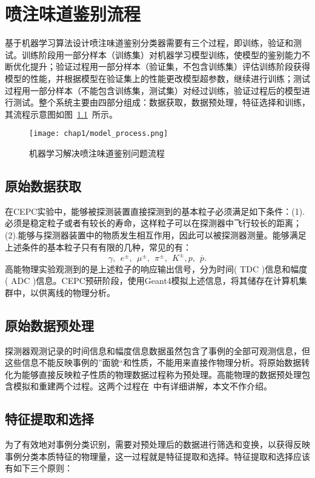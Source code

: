 \chapter{喷注味道鉴别流程}
基于机器学习算法设计喷注味道鉴别分类器需要有三个过程，即训练，验证和测试。训练阶段用一部分样本（训练集）对机器学习模型训练，使模型的鉴别能力不断优化提升；验证过程用一部分样本（验证集，不包含训练集）评估训练阶段获得模型的性能，并根据模型在验证集上的性能更改模型超参数，继续进行训练；测试过程用一部分样本（不能包含训练集，测试集）对经过训练，验证过程后的模型进行测试。整个系统主要由四部分组成：数据获取，数据预处理，特征选择和训练，其流程示意图如图~\ref{fig:model_process}~所示。
\begin{figure}[!htb]
  \centering
  \texttt{[image: chap1/model\_process.png]}
  \caption{机器学习解决喷注味道鉴别问题流程}
  \label{fig:model_process}
\end{figure}

\section{原始数据获取}
在CEPC实验中，能够被探测装置直接探测到的基本粒子必须满足如下条件：(1).必须是稳定粒子或者有较长的寿命，这样粒子可以在探测器中飞行较长的距离；(2).能够与探测器装置中的物质发生相互作用，因此可以被探测器测量。能够满足上述条件的基本粒子只有有限的几种，常见的有：
$$\gamma,~~ e^{\pm},~~ \mu^{\pm},~~ \pi^{\pm},~~ K^{\pm}, p,~~ \overline{p}.$$
高能物理实验观测到的是上述粒子的响应输出信号，分为时间( TDC )信息和幅度( ADC )信息。CEPC预研阶段，使用Geant4模拟上述信息，将其储存在计算机集群中，以供离线的物理分析。

\section{原始数据预处理}
探测器观测记录的时间信息和幅度信息数据虽然包含了事例的全部可观测信息，但这些信息不能反映事例的”面貌“和性质，不能用来直接作物理分析。将原始数据转化为能够直接反映粒子性质的物理数据过程称为预处理。高能物理的数据预处理包含模拟和重建两个过程。这两个过程在~\cite{zhengzhipeng}中有详细讲解，本文不作介绍。

\section{特征提取和选择}
为了有效地对事例分类识别，需要对预处理后的数据进行筛选和变换，以获得反映事例分类本质特征的物理量，这一过程就是特征提取和选择。特征提取和选择应该有如下三个原则：

